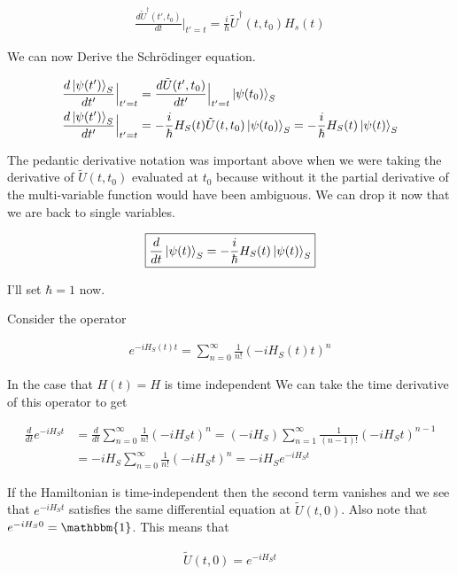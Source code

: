 \documentclass[12pt]{article}
\begin{document}
\begin{align}
\frac{d \tilde{U}^{\dag}(t',t_0)}{d t} \Bigr \rvert_{t'=t} = \frac{i}{\hbar} \tilde{U}^{\dag}(t,t_0) H_s(t)
\end{align}

We can now Derive the Schr{\"o}dinger equation.

\begin{align}
\frac{d \ket{\psi(t')}_S}{d t'} \Bigr \rvert_{t'=t} &= \frac{d \tilde{U}(t',t_0)}{dt'} \Bigr \rvert_{t'=t} \ket{\psi(t_0)}_S\\
\frac{d \ket{\psi(t')}_S}{d t'} \Bigr \rvert_{t'=t} &= -\frac{i}{\hbar} H_S(t) \tilde{U}(t,t_0) \ket{\psi(t_0)}_S = -\frac{i}{\hbar} H_S(t)\ket{\psi(t)}_S
\end{align}

The pedantic derivative notation was important above when we were taking the derivative of $\tilde{U}(t,t_0)$ evaluated at $t_0$ because without it the partial derivative of the multi-variable function would have been ambiguous. We can drop it now that we are back to single variables.

\begin{align}
\boxed{\frac{d}{d t} \ket{\psi(t)}_S = -\frac{i}{\hbar} H_S(t) \ket{\psi(t)}_S}
\end{align}

I'll set $\hbar = 1$ now.

Consider the operator

\begin{align}
e^{-i H_S(t) t} = \sum_{n=0}^{\infty} \frac{1}{n!} (-i H_S(t) t)^n
\end{align}

In the case that $H(t)=H$ is time independent We can take the time derivative of this operator to get

\begin{align}
\frac{d}{dt} e^{-iH_S t} &= \frac{d}{dt} \sum_{n=0}^{\infty} \frac{1}{n!} (-iH_S t)^n = (-iH_S)\sum_{n=1}^{\infty} \frac{1}{(n-1)!} (-iH_S t)^{n-1}\\
&= -iH_S\sum_{n=0}^{\infty} \frac{1}{n!} (-iH_S t)^{n} = -iH_S e^{-iH_S t} 
\end{align}


If the Hamiltonian is time-independent then the second term vanishes and we see that $e^{-iH_S t}$ satisfies the same differential equation at $\tilde{U}(t,0)$. Also note that $e^{-iH_S 0} = \mathbbm{1}$. This means that

\begin{align}
\tilde{U}(t,0) = e^{-iH_S t}
\end{align}
\end{document}
